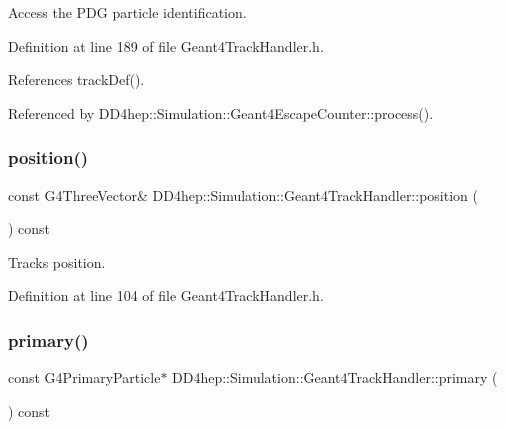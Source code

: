 Access the P\+DG particle identification. 



Definition at line 189 of file Geant4\+Track\+Handler.\+h.



References track\+Def().



Referenced by D\+D4hep\+::\+Simulation\+::\+Geant4\+Escape\+Counter\+::process().

\hypertarget{class_d_d4hep_1_1_simulation_1_1_geant4_track_handler_a03fa77009e7a4af92b45457be799baa5}{}\label{class_d_d4hep_1_1_simulation_1_1_geant4_track_handler_a03fa77009e7a4af92b45457be799baa5} 
\subsubsection{\texorpdfstring{position()}{position()}}
{\footnotesize\ttfamily const G4\+Three\+Vector\& D\+D4hep\+::\+Simulation\+::\+Geant4\+Track\+Handler\+::position (\begin{DoxyParamCaption}{ }\end{DoxyParamCaption}) const\hspace{0.3cm}{\ttfamily [inline]}}



Track\textquotesingle{}s position. 



Definition at line 104 of file Geant4\+Track\+Handler.\+h.

\hypertarget{class_d_d4hep_1_1_simulation_1_1_geant4_track_handler_afb8ea564a87f821b18d3a5ae9e09bf70}{}\label{class_d_d4hep_1_1_simulation_1_1_geant4_track_handler_afb8ea564a87f821b18d3a5ae9e09bf70} 
\subsubsection{\texorpdfstring{primary()}{primary()}}
{\footnotesize\ttfamily const G4\+Primary\+Particle$\ast$ D\+D4hep\+::\+Simulation\+::\+Geant4\+Track\+Handler\+::primary (\begin{DoxyParamCaption}{ }\end{DoxyParamCaption}) const\hspace{0.3cm}{\ttfamily [inline]}}



